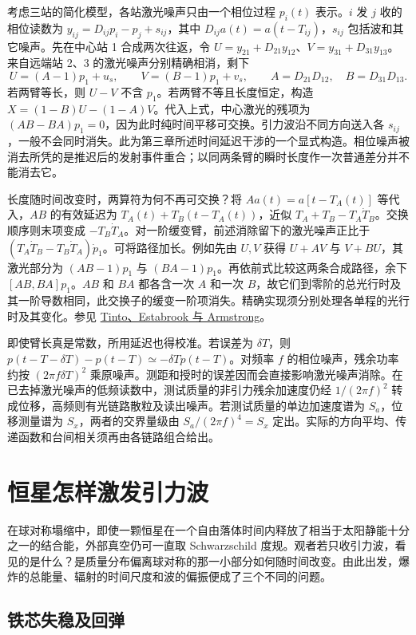 考虑三站的简化模型，各站激光噪声只由一个相位过程 $p_i(t)$ 表示。$i$ 发 $j$ 收的相位读数为 $y_{ij}=D_{ij}p_i-p_j+s_{ij}$，其中 $D_{ij}a(t)=a(t-T_{ij})$，$s_{ij}$ 包括波和其它噪声。先在中心站 1 合成两次往返，令 $U=y_{21}+D_{21}y_{12}$、$V=y_{31}+D_{31}y_{13}$。来自远端站 2、3 的激光噪声分别精确相消，剩下
\[
 U=(A-1)p_1+u_s,\qquad V=(B-1)p_1+v_s,\qquad
 A=D_{21}D_{12},\quad B=D_{31}D_{13}.
\]
若两臂等长，则 $U-V$ 不含 $p_1$。若两臂不等且长度恒定，构造 $X=(1-B)U-(1-A)V$。代入上式，中心激光的残项为 $(AB-BA)p_1=0$，因为此时纯时间平移可交换。引力波沿不同方向送入各 $s_{ij}$，一般不会同时消失。此为第三章所述时间延迟干涉的一个显式构造。相位噪声被消去所凭的是推迟后的发射事件重合；以同两条臂的瞬时长度作一次普通差分并不能消去它。

长度随时间改变时，两算符为何不再可交换？将 $Aa(t)=a[t-T_A(t)]$ 等代入，$AB$ 的有效延迟为 $T_A(t)+T_B(t-T_A(t))$，近似 $T_A+T_B-T_A\dot T_B$。交换顺序则末项变成 $-T_B\dot T_A$。对一阶缓变臂，前述消除留下的激光噪声正比于 $(T_A\dot T_B-T_B\dot T_A)\dot p_1$。可将路径加长。例如先由 $U,V$ 获得 $U+AV$ 与 $V+BU$，其激光部分为 $(AB-1)p_1$ 与 $(BA-1)p_1$。再依前式比较这两条合成路径，余下 $[AB,BA]p_1$。$AB$ 和 $BA$ 都各含一次 $A$ 和一次 $B$，故它们到零阶的总光行时及其一阶导数相同，此交换子的缓变一阶项消失。精确实现须分别处理各单程的光行时及其变化。参见 \href{https://arxiv.org/abs/gr-qc/0310017}{Tinto、Estabrook 与 Armstrong}。

即使臂长真是常数，所用延迟也得校准。若误差为 $\delta T$，则 $p(t-T-\delta T)-p(t-T)\simeq-\delta T\dot p(t-T)$。对频率 $f$ 的相位噪声，残余功率约按 $(2\pi f\delta T)^2$ 乘原噪声。测距和授时的误差因而会直接影响激光噪声消除。在已去掉激光噪声的低频读数中，测试质量的非引力残余加速度仍经 $1/(2\pi f)^2$ 转成位移，高频则有光链路散粒及读出噪声。若测试质量的单边加速度谱为 $S_a$，位移测量谱为 $S_x$，两者的交界量级由 $S_a/(2\pi f)^4=S_x$ 定出。实际的方向平均、传递函数和台间相关须再由各链路组合给出。

\section{恒星怎样激发引力波}\label{sec:gw-cstars}

在球对称塌缩中，即使一颗恒星在一个自由落体时间内释放了相当于太阳静能十分之一的结合能，外部真空仍可一直取 Schwarzschild 度规。观者若只收引力波，看见的是什么？是质量分布偏离球对称的那一小部分如何随时间改变。由此出发，爆炸的总能量、辐射的时间尺度和波的偏振便成了三个不同的问题。

\subsection{铁芯失稳及回弹}


